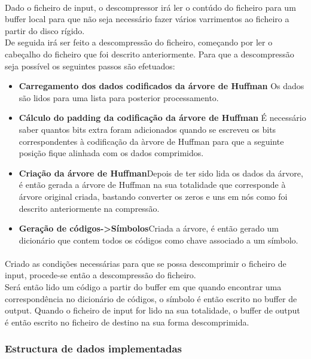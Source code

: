 \documentclass[paper=a4, fontsize=11pt]{scrartcl}
\numberwithin{equation}{section}		%
\numberwithin{figure}{section}			%
\numberwithin{table}{section}				%
\begin{document}
\paragraph{}Dado o ficheiro de input, o descompressor irá ler o contúdo do ficheiro para um buffer local para que não seja necessário fazer vários varrimentos ao ficheiro a partir do disco rígido.
\\
De seguida irá ser feito a descompressão do ficheiro, começando por ler o cabeçalho do ficheiro que foi descrito anteriormente. Para que a descompressão seja possível os seguintes passos são efetuados:

\begin{itemize}
  \item \textbf{Carregamento dos dados codificados da árvore de Huffman} Os dados são lidos para uma lista para posterior processamento.
  \item \textbf{Cálculo do padding da codificação da árvore de Huffman} É necessário saber quantos bits extra foram adicionados quando se escreveu os bits correspondentes à codificação da àrvore de Huffman para que a seguinte posição fique alinhada com os dados comprimidos.
  \item \textbf{Criação da árvore de Huffman}Depois de ter sido lida os dados da árvore, é então gerada a árvore de Huffman na sua totalidade que corresponde à árvore original criada, bastando converter os zeros e uns em nós como foi descrito anteriormente na compressão.
  \item \textbf{Geração de códigos->Símbolos}Criada a árvore, é então gerado um dicionário que contem todos os códigos como chave associado a um símbolo.
\end{itemize}
\paragraph{}Criado as condições necessárias para que se possa descomprimir o ficheiro de input, procede-se então a descompressão do ficheiro.
\\
Será então lido um código a partir do buffer em que quando encontrar uma correspondência no dicionário de códigos, o símbolo é então escrito no buffer de output.
Quando o ficheiro de input for lido na sua totalidade, o buffer de output é então escrito no ficheiro de destino na sua forma descomprimida.

\subsubsection{Estructura de dados implementadas}
\end{document}
